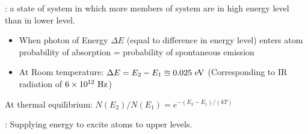 : a state of system in which more members of system are in high energy level than in lower level.
\begin{itemize}
	\item When photon of Energy $\Delta E$ (equal to difference in energy level) enters atom\\
	      probability of absorption = probability of spontaneous emission
	\item At Room temperature: $\Delta E = E_2-E_1 \approxeq 0.025 \mathrm{~eV}$ (Corresponding to IR radiation of $6 \times 10^{12} \mathrm{~Hz}$)
\end{itemize}

\vspace{.5cm}



\vspace{.5cm}

At thermal equilibrium: $N\left(E_2\right) / N\left(E_1\right)=e ^ {-\left(E_2-E_1\right) / (kT)}$

\vspace{.4cm}


: Supplying energy to excite atoms to upper levels.
